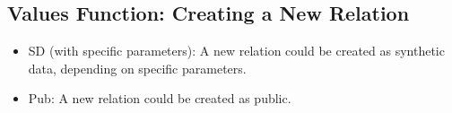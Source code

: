 \documentclass[letterpaper]{article} %
\begin{document}
\subsection{Values Function: Creating a New Relation}
\begin{itemize}
    \item \textrightarrow{} SD (with specific parameters): A new relation could be created as synthetic data, depending on specific parameters.
    \item \textrightarrow{} Pub: A new relation could be created as public.
\end{itemize}
\end{document}
